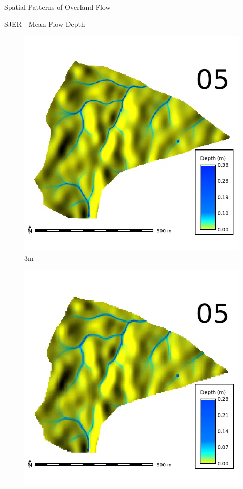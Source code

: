 \documentclass[
  ignorenonframetext,
]{beamer}
\begin{document}
\begin{frame}{Spatial Patterns of Overland Flow}
\begin{block}{SJER - Mean Flow Depth}
\begin{figure}[H]
{\centering \includegraphics{../output/SJER/sensitivity_1/SJER_depth_3_1_s_average.webp}

}

\caption{3m}

\end{figure}%

\begin{figure}[H]

{\centering \includegraphics{../output/SJER/sensitivity_1/SJER_depth_5_1_s_average.webp}

}
\end{figure}
\end{block}
\end{frame}
\end{document}
